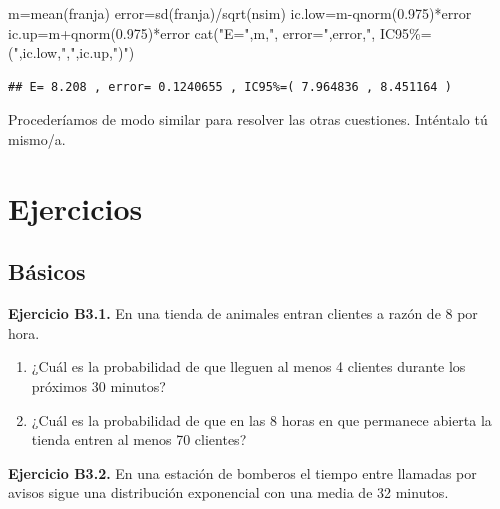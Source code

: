 \documentclass[
]{book}
\newenvironment{Shaded}{\begin{snugshade}}{\end{snugshade}}
\newcommand{\FloatTok}[1]{\textcolor[rgb]{0.00,0.00,0.81}{#1}}
\newcommand{\FunctionTok}[1]{\textcolor[rgb]{0.00,0.00,0.00}{#1}}
\newcommand{\NormalTok}[1]{#1}
\newcommand{\OtherTok}[1]{\textcolor[rgb]{0.56,0.35,0.01}{#1}}
\newcommand{\SpecialCharTok}[1]{\textcolor[rgb]{0.00,0.00,0.00}{#1}}
\newcommand{\StringTok}[1]{\textcolor[rgb]{0.31,0.60,0.02}{#1}}
\providecommand{\tightlist}{%
  \setlength{\itemsep}{0pt}\setlength{\parskip}{0pt}}
\theoremstyle{definition}
\theoremstyle{definition}
\theoremstyle{definition}
\theoremstyle{definition}
\theoremstyle{remark}
\begin{document}
\begin{Shaded}
\begin{Highlighting}[]
\NormalTok{m}\OtherTok{=}\FunctionTok{mean}\NormalTok{(franja)}
\NormalTok{error}\OtherTok{=}\FunctionTok{sd}\NormalTok{(franja)}\SpecialCharTok{/}\FunctionTok{sqrt}\NormalTok{(nsim)}
\NormalTok{ic.low}\OtherTok{=}\NormalTok{m}\SpecialCharTok{{-}}\FunctionTok{qnorm}\NormalTok{(}\FloatTok{0.975}\NormalTok{)}\SpecialCharTok{*}\NormalTok{error}
\NormalTok{ic.up}\OtherTok{=}\NormalTok{m}\SpecialCharTok{+}\FunctionTok{qnorm}\NormalTok{(}\FloatTok{0.975}\NormalTok{)}\SpecialCharTok{*}\NormalTok{error}
\FunctionTok{cat}\NormalTok{(}\StringTok{"E="}\NormalTok{,m,}\StringTok{", error="}\NormalTok{,error,}\StringTok{", IC95\%=("}\NormalTok{,ic.low,}\StringTok{","}\NormalTok{,ic.up,}\StringTok{")"}\NormalTok{)}
\end{Highlighting}
\end{Shaded}

\begin{verbatim}
## E= 8.208 , error= 0.1240655 , IC95%=( 7.964836 , 8.451164 )
\end{verbatim}

Procederíamos de modo similar para resolver las otras cuestiones. Inténtalo tú mismo/a.

\hypertarget{ejer-u3}{%
\section{Ejercicios}\label{ejer-u3}}

\hypertarget{buxe1sicos-2}{%
\subsection{Básicos}\label{buxe1sicos-2}}

\textbf{Ejercicio B3.1.} En una tienda de animales entran clientes a razón de 8 por hora.

\begin{enumerate}
\def\labelenumi{\arabic{enumi}.}
\tightlist
\item
  ¿Cuál es la probabilidad de que lleguen al menos 4 clientes durante los próximos 30 minutos?
\item
  ¿Cuál es la probabilidad de que en las 8 horas en que permanece abierta la tienda entren al menos 70 clientes?
\end{enumerate}

\textbf{Ejercicio B3.2.} En una estación de bomberos el tiempo entre llamadas por avisos sigue una distribución exponencial con una media de 32 minutos.
\end{document}
